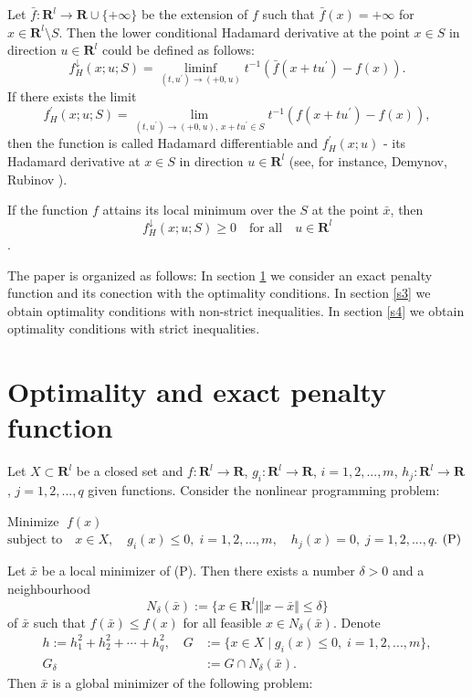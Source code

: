 \documentclass[12pt]{article}
\def\R{\mathbf R}
\def\E{\mathbf R^l}
\def\ld#1{#1^{\downarrow}_{H}}
\def\d#1{#1^{\prime}_{H}}
\newcommand{\norm}[1]{\Vert#1\Vert}
\begin{document}
Let $\bar f:\E\to\R\cup\{+\infty\}$ be the extension of $f$ such that
$\bar f(x)=+\infty$ for $x\in\E\setminus S$.
Then the lower conditional Hadamard derivative at the point $x\in S$ in direction $u\in\E$
could be defined as follows:
\[
\ld f (x;u;S)=\liminf_{(t,u^\prime)\to (+0,u)}
t^{-1}(\bar f(x+tu^\prime)-f(x)).
\]
If there exists the limit
\[
\d f (x;u;S)=\lim_{(t,u^\prime) \to (+0,u),\, x+tu^\prime\in S}
t^{-1}(f(x+tu^\prime)-f(x)),
\] then the function is called Hadamard differentiable
and $\d f (x;u)$ - its Hadamard derivative at $x\in S$ in direction $u\in\E$
(see, for instance, Demynov, Rubinov \cite{dem95}).

If the function $f$ attains its local minimum over the $S$ at the point
$\bar x$, then 
\[\ld f (x;u;S)\ge 0\quad\textrm{for all}\quad u\in\E\].


The paper is organized as follows: In section \ref{s2} we consider an exact penalty function and its conection with the optimality conditions.
In section \ref{s3} we obtain optimality conditions with non-strict inequalities. 
In section \ref{s4} we obtain optimality conditions with strict inequalities.





\section{Optimality and exact penalty function}
\label{s2}
Let $X\subset\E$ be a closed set and $f:\E \to\R$, $g_i:\E\to\R$, $i=1,2,...,m$,
$h_j:\E\to\R$, $j=1,2,...,q$ given functions. Consider the nonlinear
programming problem:


\vspace{0.5cm}
\noindent
$\textrm{Minimize }\;f(x)$ \\
$\textrm{subject to}\quad x\in X,\quad
g_i(x)\le0,\;i=1,2,...,m,\quad h_j(x)=0,\; j=1,2,...,q$. \hfill ${\rm{(P)}}$
\vspace{0.5cm}

Let $\bar x$ be a local minimizer of (P). Then there exists a number $\delta>0$
and a neighbourhood 
$$N_\delta(\bar x):=\{x\in\E\mid\norm{x-\bar x}\le\delta\}$$
of $\bar x$ such that $f(\bar x)\le f(x)$ for all feasible
$x\in N_\delta(\bar x)$.
Denote
\[
\begin{array}{rl}
h :=h_1^2+h_2^2+\cdots+h_q^2,\quad
G & :=\{x\in X \mid g_i(x)\le 0,\; i=1,2,...,m\},\\
G_\delta & :=G\cap N_\delta(\bar x).
\end{array}
\]
Then $\bar x$ is a global minimizer of the following problem:
\end{document}
